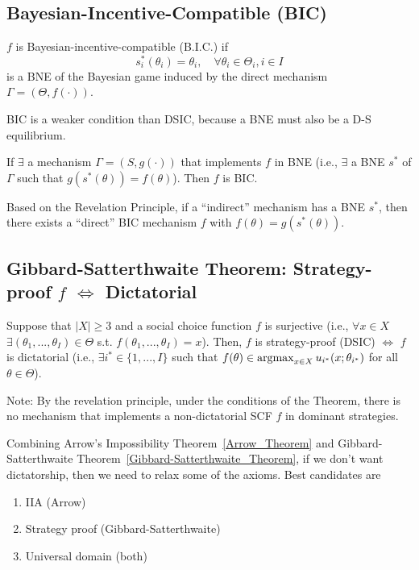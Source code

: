 \documentclass[11pt]{elegantbook_2}
\newcommand{\argmax}{\operatornamewithlimits{argmax}}
\begin{document}
\subsection{Bayesian-Incentive-Compatible (BIC)}
\begin{definition}[BIC]
    $f$ is Bayesian-incentive-compatible (B.I.C.) if $$s^*_i(\theta_i)=\theta_i,\quad \forall \theta_i\in\Theta_i,i\in I$$ is a BNE of the Bayesian game induced by the direct mechanism $\Gamma=(\Theta,f(\cdot))$.
\end{definition}
BIC is a weaker condition than DSIC, because a BNE must also be a D-S equilibrium.

\begin{theorem}\label{theorem:revelation principle BIC}
    If $\exists$ a mechanism $\Gamma=(S,g(\cdot))$ that implements $f$ in BNE (i.e., $\exists$ a BNE $s^*$ of $\Gamma$ such that $g(s^*(\theta))=f(\theta)$). Then $f$ is BIC.
    \begin{note}
        Based on the Revelation Principle, if a ``indirect'' mechanism has a BNE $s^*$, then there exists a ``direct'' BIC mechanism $f$ with $f(\theta)=g(s^*(\theta))$.
    \end{note}
\end{theorem}


\subsection{Gibbard-Satterthwaite Theorem: Strategy-proof $f$ $\Leftrightarrow$ Dictatorial}
\begin{theorem}\label{Gibbard-Satterthwaite_Theorem}
    Suppose that $|X|\geq 3$ and a social choice function $f$ is surjective (i.e., $\forall x\in X$ $\exists (\theta_1,...,\theta_I)\in\Theta$ s.t. $f(\theta_1,...,\theta_I)=x$). Then, $f$ is strategy-proof (DSIC) $\Leftrightarrow$ $f$ is dictatorial (i.e., $\exists i^*\in\{1,...,I\}$ such that $f(\theta)\in \argmax_{x\in X}u_{i^*}(x;\theta_{i^*})$ for all $\theta\in \Theta$).
\end{theorem}
Note: By the revelation principle, under the conditions of the Theorem, there is no mechanism that implements a non-dictatorial SCF $f$ in dominant strategies.

\begin{remark}
    Combining Arrow's Impossibility Theorem~\ref{Arrow_Theorem} and Gibbard-Satterthwaite Theorem~\ref{Gibbard-Satterthwaite_Theorem}, if we don't want dictatorship, then we need to relax some of the axioms. Best candidates are
    \begin{enumerate}
        \item IIA (Arrow)
        \item Strategy proof (Gibbard-Satterthwaite)
        \item Universal domain (both)
    \end{enumerate}
\end{remark}
\end{document}
